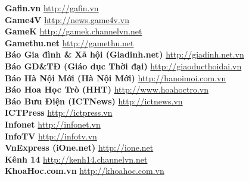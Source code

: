 \textbf{Gafin.vn}  \hspace{0.5in} \href{http://gafin.vn}{http://gafin.vn} \\ 
\textbf{Game4V}  \hspace{0.5in} \href{http://news.game4v.vn}{http://news.game4v.vn} \\ 
\textbf{GameK}  \hspace{0.5in} \href{http://gamek.channelvn.net}{http://gamek.channelvn.net} \\ 
\textbf{Gamethu.net}  \hspace{0.5in} \href{http://gamethu.net}{http://gamethu.net} \\ 
\textbf{Báo Gia đình & Xã hội (Giadinh.net)}  \hspace{0.5in} \href{http://giadinh.net.vn}{http://giadinh.net.vn} \\ 
\textbf{Báo GD&TĐ (Giáo dục Thời đại)}  \hspace{0.5in} \href{http://giaoducthoidai.vn}{http://giaoducthoidai.vn} \\ 
\textbf{Báo Hà Nội Mới (Hà Nội Mới)}  \hspace{0.5in} \href{http://hanoimoi.com.vn}{http://hanoimoi.com.vn} \\ 
\textbf{Báo Hoa Học Trò (HHT)}  \hspace{0.5in} \href{http://www.hoahoctro.vn}{http://www.hoahoctro.vn} \\ 
\textbf{Báo Bưu Điện (ICTNews)}  \hspace{0.5in} \href{http://ictnews.vn}{http://ictnews.vn} \\ 
\textbf{ICTPress}  \hspace{0.5in} \href{http://ictpress.vn}{http://ictpress.vn} \\ 
\textbf{Infonet}  \hspace{0.5in} \href{http://infonet.vn}{http://infonet.vn} \\ 
\textbf{InfoTV}  \hspace{0.5in} \href{http://infotv.vn}{http://infotv.vn} \\ 
\textbf{VnExpress (iOne.net)}  \hspace{0.5in} \href{http://ione.net}{http://ione.net} \\ 
\textbf{Kênh 14}  \hspace{0.5in} \href{http://kenh14.channelvn.net}{http://kenh14.channelvn.net} \\ 
\textbf{KhoaHoc.com.vn}  \hspace{0.5in} \href{http://khoahoc.com.vn}{http://khoahoc.com.vn} \\ 
